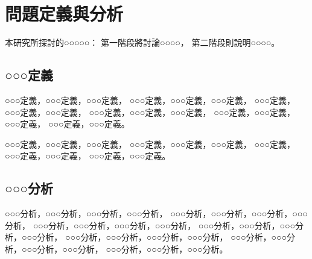 \chapter{問題定義與分析}
\label{chapter:analysis}
    本研究所探討的○○○○○：
    第一階段將討論○○○○，
    第二階段則說明○○○○。

\section{○○○定義}
    ○○○定義，○○○定義，○○○定義，
    ○○○定義，○○○定義，○○○定義，
    ○○○定義，○○○定義，○○○定義，
    ○○○定義，○○○定義，○○○定義，
    ○○○定義，○○○定義，○○○定義，
    ○○○定義，○○○定義。
    
    ○○○定義，○○○定義，○○○定義，
    ○○○定義，○○○定義，○○○定義，
    ○○○定義，○○○定義，○○○定義，
    ○○○定義，○○○定義。

\section{○○○分析}
    ○○○分析，○○○分析，○○○分析，○○○分析，
    ○○○分析，○○○分析，○○○分析，○○○分析，
    ○○○分析，○○○分析，○○○分析，○○○分析，
    ○○○分析，○○○分析，○○○分析，○○○分析，
    ○○○分析，○○○分析，○○○分析，○○○分析，
    ○○○分析，○○○分析，○○○分析，○○○分析，
    ○○○分析，○○○分析，○○○分析。

